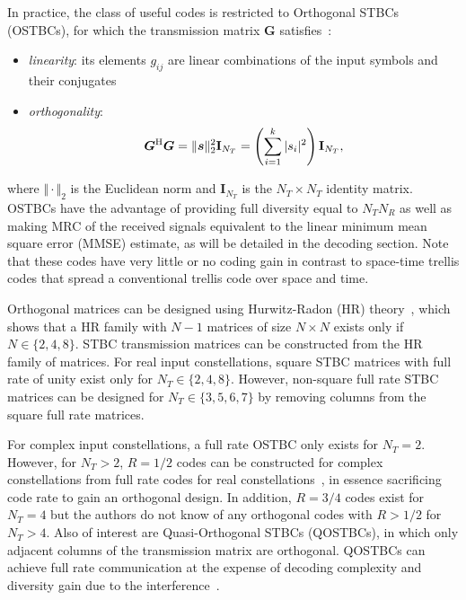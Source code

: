 In practice, the class of useful codes is restricted to Orthogonal STBCs (OSTBCs), for which the transmission matrix $\bm{G}$ satisfies~\cite{alamouti98}:
\begin{itemize}
\item \emph{linearity}: its elements $g_{ij}$ are linear combinations of the input symbols and their conjugates
\item \emph{orthogonality}:
  \[ \bm{G}^\text{H}\bm{G} = \Vert\bm{s}\Vert_2^2 \mathbf{I}_{N_T} = \left(\sum_{i=1}^k |s_i|^2\right) \mathbf{I}_{N_T} , \]
\end{itemize}
where $\Vert\cdot\Vert_2$ is the Euclidean norm and $\mathbf{I}_{N_T}$ is the $N_T\times N_T$ identity matrix. OSTBCs have the advantage of providing full diversity equal to $N_TN_R$ as well as making MRC of the received signals equivalent to the linear minimum mean square error (MMSE) estimate, as will be detailed in the decoding section. Note that these codes have very little or no coding gain in contrast to space-time trellis codes that spread a conventional trellis code over space and time.

Orthogonal matrices can be designed using Hurwitz-Radon (HR) theory~\cite{seberry05,wolfe76}, which shows that a HR family with $N-1$ matrices of size $N\times N$ exists only if $N\in\{2,4,8\}$. STBC transmission matrices can be constructed from the HR family of matrices. For real input constellations, square STBC matrices with full rate of unity exist only for $N_T\in\{2,4,8\}$. However, non-square full rate STBC matrices can be designed for $N_T\in\{3,5,6,7\}$ by removing columns from the square full rate matrices.

For complex input constellations, a full rate OSTBC only exists for $N_T=2$. However, for $N_T>2$, $R=1/2$ codes can be constructed for complex constellations from full rate codes for real constellations~\cite{tarokh99}, in essence sacrificing code rate to gain an orthogonal design. In addition, $R=3/4$ codes exist for $N_T=4$ but the authors do not know of any orthogonal codes with $R>1/2$ for $N_T>4$. Also of interest are Quasi-Orthogonal STBCs (QOSTBCs), in which only adjacent columns of the transmission matrix are orthogonal. QOSTBCs can achieve full rate communication at the expense of decoding complexity and diversity gain due to the interference~\cite{jafarkhani05}.

